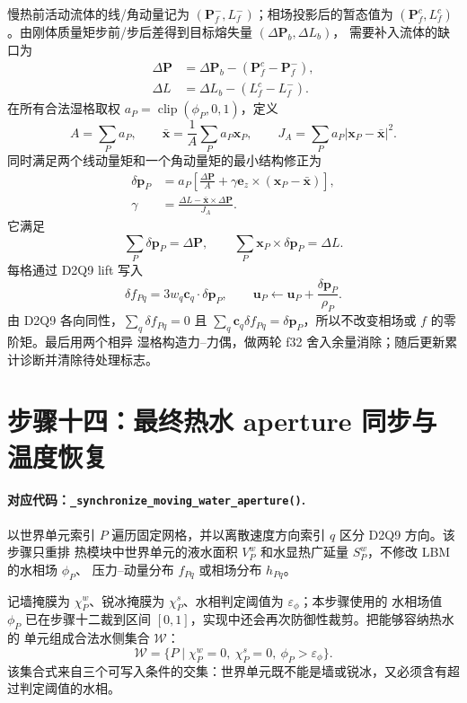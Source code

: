 \documentclass[UTF8,zihao=-4]{ctexart}
\newcommand{\vect}[1]{\boldsymbol{#1}}
\newcommand{\clip}{\operatorname{clip}}
\newcommand{\code}[1]{\texttt{#1}}
\newcommand{\stepname}[1]{\paragraph{对应代码：\code{#1}.}}
\numberwithin{equation}{section}
\begin{document}
慢热前活动流体的线/角动量记为 $(\vect P_f^-,L_f^-)$；相场投影后的暂态值为
$(\vect P_f^c,L_f^c)$。由刚体质量矩步前/步后差得到目标熔失量 $(\Delta\vect P_b,\Delta L_b)$，
需要补入流体的缺口为
\begin{align}
  \Delta\vect P&=\Delta\vect P_b-(\vect P_f^c-\vect P_f^-),\\
  \Delta L&=\Delta L_b-(L_f^c-L_f^-).
  \label{eq:melt-momentum-gap}
\end{align}
在所有合法湿格取权 $a_P=\clip(\phi_P,0,1)$，定义
\begin{equation}
  A=\sum_Pa_P,
  \qquad \bar{\vect x}=\frac1A\sum_Pa_P\vect x_P,
  \qquad J_A=\sum_Pa_P|\vect x_P-\bar{\vect x}|^2.
\end{equation}
同时满足两个线动量矩和一个角动量矩的最小结构修正为
\begin{align}
  \delta\vect p_P&=a_P\left[
  \frac{\Delta\vect P}{A}
  +\gamma\vect e_z\times(\vect x_P-\bar{\vect x})\right],\\
  \gamma&=\frac{\Delta L-\bar{\vect x}\times\Delta\vect P}{J_A}.
  \label{eq:three-moment-lift}
\end{align}
它满足
\begin{equation}
  \sum_P\delta\vect p_P=\Delta\vect P,
  \qquad
  \sum_P\vect x_P\times\delta\vect p_P=\Delta L.
\end{equation}
每格通过 D2Q9 lift 写入
\begin{equation}
  \delta f_{Pq}=3w_q\vect c_q\cdot\delta\vect p_P,
  \qquad
  \vect u_P\leftarrow\vect u_P+\frac{\delta\vect p_P}{\rho_P}.
  \label{eq:d2q9-momentum-lift}
\end{equation}
由 D2Q9 各向同性，$\sum_q\delta f_{Pq}=0$ 且
$\sum_q\vect c_q\delta f_{Pq}=\delta\vect p_P$，所以不改变相场或 $f$ 的零阶矩。最后用两个相异
湿格构造力--力偶，做两轮 f32 舍入余量消除；随后更新累计诊断并清除待处理标志。

\section{步骤十四：最终热水 aperture 同步与温度恢复}
\label{sec:aperture}

\stepname{\_synchronize\_moving\_water\_aperture()}
以世界单元索引 $P$ 遍历固定网格，并以离散速度方向索引 $q$ 区分 D2Q9 方向。该步骤只重排
热模块中世界单元的液水面积 $V_P^w$ 和水显热广延量 $S_P^w$，不修改 LBM 的水相场 $\phi_P$、
压力--动量分布 $f_{Pq}$ 或相场分布 $h_{Pq}$。

记墙掩膜为 $\chi_P^w$、锐冰掩膜为 $\chi_P^s$、水相判定阈值为 $\varepsilon_\phi$；本步骤使用的
水相场值 $\phi_P$ 已在步骤十二裁到区间 $[0,1]$，实现中还会再次防御性裁剪。把能够容纳热水的
单元组成合法水侧集合 $\mathcal W$：
\begin{equation}
  \mathcal W=\{P\mid \chi_P^w=0,\ \chi_P^s=0,
  \ \phi_P>\varepsilon_\phi\}.
\end{equation}
该集合式来自三个可写入条件的交集：世界单元既不能是墙或锐冰，又必须含有超过判定阈值的水相。
\end{document}
